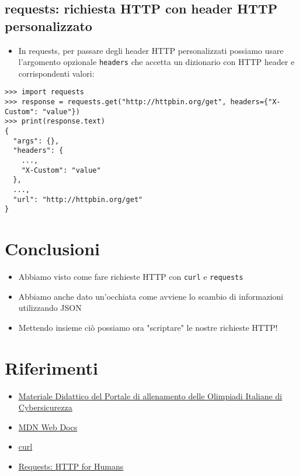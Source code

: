 \documentclass{beamer}
\newcommand{\code}[1]{\mbox{\texttt{#1}}}
\begin{document}
\subsection*{requests: richiesta HTTP con header HTTP personalizzato}
\begin{frame}{\insertsection}{\insertsubsection}
\begin{itemize}
\item In requests, per passare degli header HTTP personalizzati possiamo usare
l'argomento opzionale \code{headers} che accetta un dizionario con HTTP header e
corrispondenti valori:
\end{itemize}
{\tiny
\begin{verbatim}
>>> import requests
>>> response = requests.get("http://httpbin.org/get", headers={"X-Custom": "value"})
>>> print(response.text)
{
  "args": {},
  "headers": {
    ...,
    "X-Custom": "value"
  },
  ...,
  "url": "http://httpbin.org/get"
}
\end{verbatim}
}
\end{frame}

\section{Conclusioni}
\begin{frame}{\insertsection}
\begin{itemize}
\item Abbiamo visto come fare richieste HTTP con \code{curl} e \code{requests}
\item Abbiamo anche dato un'occhiata come avviene lo scambio di informazioni
utilizzando JSON
\item Mettendo insieme ciò possiamo ora "scriptare" le nostre richieste HTTP!
\end{itemize}
\end{frame}

\section{Riferimenti}
\begin{frame}{\insertsection}
\begin{itemize}
\item \href{https://training.olicyber.it/training}{Materiale Didattico del Portale di allenamento delle Olimpiadi Italiane di Cybersicurezza} 
\item \href{https://developer.mozilla.org/en-US/}{MDN Web Docs} 
\item \href{https://curl.se}{curl} 
\item \href{https://requests.readthedocs.io/}{Requests: HTTP for Humans} 
\end{itemize}
\end{frame}
\end{document}
